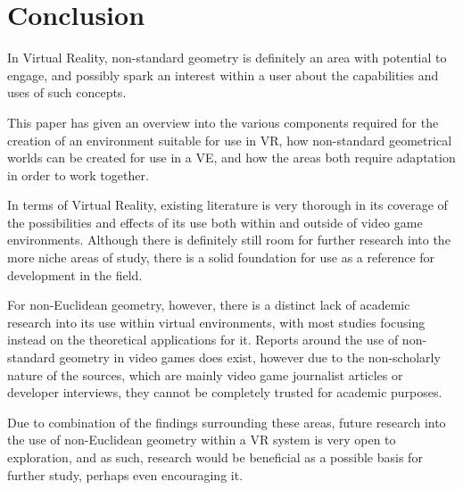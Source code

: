 \section{Conclusion}
\label{lr:conclusion}

	In Virtual Reality, non-standard geometry is definitely an area with potential to engage, and possibly spark an interest within a user about the capabilities and uses of such concepts.
	
	This paper has given an overview into the various components required for the creation of an environment suitable for use in VR, how non-standard geometrical worlds can be created for use in a VE, and how the areas both require adaptation in order to work together.
	
	In terms of Virtual Reality, existing literature is very thorough in its coverage of the possibilities and effects of its use both within and outside of video game environments. Although there is definitely still room for further research into the more niche areas of study, there is a solid foundation for use as a reference for development in the field.
	
	For non-Euclidean geometry, however, there is a distinct lack of academic research into its use within virtual environments, with most studies focusing instead on the theoretical applications for it. Reports around the use of non-standard geometry in video games does exist, however due to the non-scholarly nature of the sources, which are mainly video game journalist articles or developer interviews, they cannot be completely trusted for academic purposes.
	
	Due to combination of the findings surrounding these areas, future research into the use of non-Euclidean geometry within a VR system is very open to exploration, and as such, research would be beneficial as a possible basis for further study, perhaps even encouraging it.
